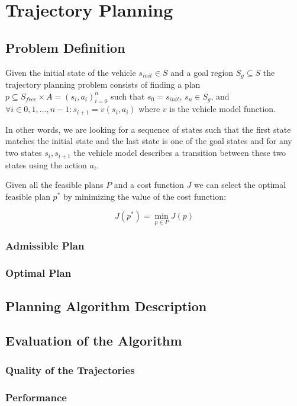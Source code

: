 \chapter{Trajectory Planning}

\section{Problem Definition}

Given the initial state of the vehicle \( s_{init} \in S \) and a goal region \( S_g \subseteq S \) the trajectory planning problem consists of finding a plan \( p \subseteq S_{free} \times A = ( s_i, a_i )_{i=0}^{n} \) such that \( s_0 = s_{init} \), \( s_n \in S_g \), and \( \forall i \in { 0, 1, ..., n-1 }: s_{i+1} = v(s_i, a_i) \) where \(v\) is the vehicle model function.

In other words, we are looking for a sequence of states such that the first state matches the initial state and the last state is one of the goal states and for any two states \( s_i, s_{i+1} \) the vehicle model describes a transition between these two states using the action \( a_i \).

Given all the feasible plans \(P\) and a cost function \(J\) we can select the optimal feasible plan \(p^*\) by minimizing the value of the cost function:

\[ J(p^*) = \min_{p \in P} J(p) \]


\subsection{Admissible Plan}

\subsection{Optimal Plan}

\section{Planning Algorithm Description}

\section{Evaluation of the Algorithm}

\subsection{Quality of the Trajectories}

\subsection{Performance}